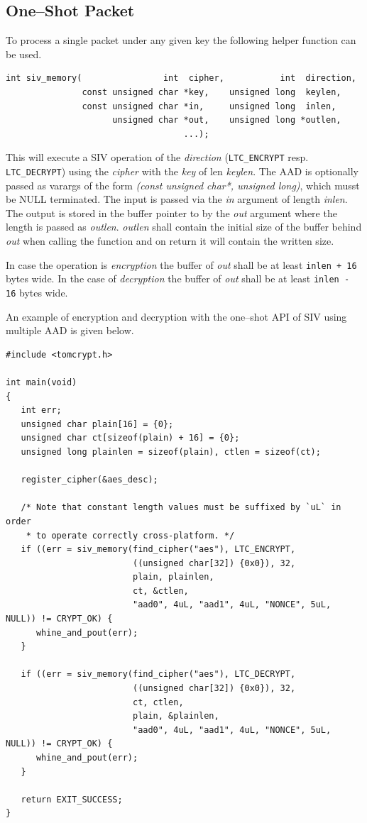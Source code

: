 \documentclass[synpaper]{book}
\begin{document}
\subsection{One--Shot Packet}
To process a single packet under any given key the following helper function can be used.

\begin{verbatim}
int siv_memory(                int  cipher,           int  direction,
               const unsigned char *key,    unsigned long  keylen,
               const unsigned char *in,     unsigned long  inlen,
                     unsigned char *out,    unsigned long *outlen,
                                   ...);
\end{verbatim}

This will execute a SIV operation of the \textit{direction} (\texttt{LTC\_ENCRYPT} resp. \texttt{LTC\_DECRYPT})
using the \textit{cipher} with the \textit{key} of len \textit{keylen}.
The AAD is optionally passed as varargs of the form \textit{(const unsigned char*, unsigned long)}, which musst be
NULL terminated.
The input is passed via the \textit{in} argument of length \textit{inlen}.
The output is stored in the buffer pointer to by the \textit{out} argument where the length is passed as \textit{outlen}.
\textit{outlen} shall contain the initial size of the buffer behind \textit{out} when calling the function and on
return it will contain the written size.

In case the operation is \textit{encryption} the buffer of \textit{out} shall be at least \texttt{inlen + 16} bytes wide.
In the case of \textit{decryption} the buffer of \textit{out} shall be at least \texttt{inlen - 16} bytes wide.

An example of encryption and decryption with the one--shot API of SIV using multiple AAD is given below.

\begin{small}
\begin{verbatim}
#include <tomcrypt.h>

int main(void)
{
   int err;
   unsigned char plain[16] = {0};
   unsigned char ct[sizeof(plain) + 16] = {0};
   unsigned long plainlen = sizeof(plain), ctlen = sizeof(ct);

   register_cipher(&aes_desc);

   /* Note that constant length values must be suffixed by `uL` in order
    * to operate correctly cross-platform. */
   if ((err = siv_memory(find_cipher("aes"), LTC_ENCRYPT,
                         ((unsigned char[32]) {0x0}), 32,
                         plain, plainlen,
                         ct, &ctlen,
                         "aad0", 4uL, "aad1", 4uL, "NONCE", 5uL, NULL)) != CRYPT_OK) {
      whine_and_pout(err);
   }

   if ((err = siv_memory(find_cipher("aes"), LTC_DECRYPT,
                         ((unsigned char[32]) {0x0}), 32,
                         ct, ctlen,
                         plain, &plainlen,
                         "aad0", 4uL, "aad1", 4uL, "NONCE", 5uL, NULL)) != CRYPT_OK) {
      whine_and_pout(err);
   }

   return EXIT_SUCCESS;
}
\end{verbatim}
\end{small}
\end{document}

